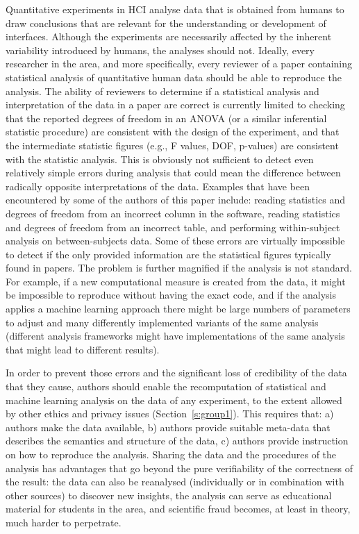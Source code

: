 Quantitative experiments in HCI analyse data that is obtained from humans to draw conclusions that are relevant for the understanding or development of interfaces. Although the experiments are necessarily affected by the inherent variability introduced by humans, the analyses should not. Ideally, every researcher in the area, and more specifically, every reviewer of a paper containing statistical analysis of quantitative human data should be able to reproduce the analysis. The ability of reviewers to determine if a statistical analysis and interpretation of the data in a paper are correct is currently limited to checking that the reported degrees of freedom in an ANOVA (or a similar inferential statistic procedure) are consistent with the design of the experiment, and that the intermediate statistic figures (e.g., F values, DOF, p-values) are consistent with the statistic analysis. This is obviously not sufficient to detect even relatively simple errors during analysis that could mean the difference between radically opposite interpretations of the data. Examples that have been encountered by some of the authors of this paper include: reading statistics and degrees of freedom from an incorrect column in the software, reading statistics and degrees of freedom from an incorrect table, and performing within-subject analysis on between-subjects data. Some of these errors are virtually impossible to detect if the only provided information are the statistical figures typically found in papers. The problem is further magnified if the analysis is not standard. For example, if a new computational measure is created from the data, it might be impossible to reproduce without having the exact code, and if the analysis applies a machine learning approach there might be large numbers of parameters to adjust and many differently implemented variants of the same analysis (different analysis frameworks might have implementations of the same analysis that might lead to different results).

In order to prevent those errors and the significant loss of credibility of the data that they cause, authors should enable the recomputation of statistical and machine learning analysis on the data of any experiment, to the extent allowed by other ethics and privacy issues (Section~\ref{s:group1}). This requires that: a) authors make the data available, b) authors provide suitable meta-data that describes the semantics and structure of the data, c) authors provide instruction on how to reproduce the analysis. Sharing the data and the procedures of the analysis has advantages that go beyond the pure verifiability of the correctness of the result: the data can also be reanalysed (individually or in combination with other sources) to discover new insights, the analysis can serve as educational material for students in the area, and scientific fraud becomes, at least in theory, much harder to perpetrate. 

